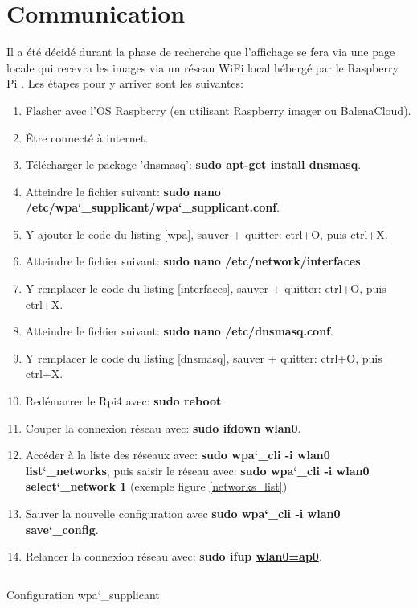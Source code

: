 \section{Communication}
Il a été décidé durant la phase de recherche que l'affichage se fera via une page locale qui recevra les images via un réseau WiFi local
hébergé par le Raspberry Pi \cite{soren_how-_2013}. Les étapes pour y arriver sont les suivantes:
\begin{enumerate}
    \item Flasher avec l'OS Raspberry (en utilisant Raspberry imager ou BalenaCloud).
    \item Être connecté à internet.
    \item Télécharger le package 'dnsmasq': \textbf{sudo apt-get install dnsmasq}.
    \item Atteindre le fichier suivant: \textbf{sudo nano /etc/wpa\char`_supplicant/wpa\char`_supplicant.conf}.
    \item Y ajouter le code du listing \ref{wpa}, sauver + quitter: ctrl+O, puis ctrl+X.
    \item Atteindre le fichier suivant: \textbf{sudo nano /etc/network/interfaces}.
    \item Y remplacer le code du listing \ref{interfaces}, sauver + quitter: ctrl+O, puis ctrl+X.
    \item Atteindre le fichier suivant: \textbf{sudo nano /etc/dnsmasq.conf}.
    \item Y remplacer le code du listing \ref{dnsmasq}, sauver + quitter: ctrl+O, puis ctrl+X.
    \item Redémarrer le Rpi4 avec: \textbf{sudo reboot}.
    \item Couper la connexion réseau avec: \textbf{sudo ifdown wlan0}.
    \item Accéder à la liste des réseaux avec: \textbf{sudo wpa\char`_cli -i wlan0 list\char`_networks}, puis saisir le réseau avec: \textbf{sudo wpa\char`_cli -i wlan0 select\char`_network 1} (exemple figure \ref{networks_list})
    \item Sauver la nouvelle configuration avec \textbf{sudo wpa\char`_cli -i wlan0 save\char`_config}.
    \item Relancer la connexion réseau avec: \textbf{sudo ifup \underline{wlan0=ap0}}.
\end{enumerate}
\begin{listing}[ht]
    \inputminted{makefile}{assets/figures/wpa_supplicant.make}
    \caption{Configuration wpa\char`_supplicant \label{wpa}}
\end{listing}

